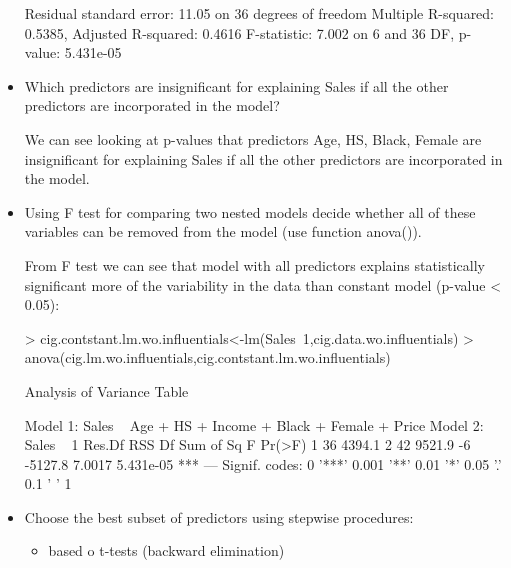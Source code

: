 \documentclass[a4paper]{article}
\begin{document}
\begin{itemize}
\begin{Schunk}
\begin{Soutput}
Residual standard error: 11.05 on 36 degrees of freedom
Multiple R-squared:  0.5385,	Adjusted R-squared:  0.4616 
F-statistic: 7.002 on 6 and 36 DF,  p-value: 5.431e-05
\end{Soutput}
\end{Schunk}
\item Which predictors are insignificant for explaining Sales if all the other
predictors are incorporated in the model?

We can see looking at p-values that predictors Age, HS, Black, Female are insignificant for explaining Sales if all the other
predictors are incorporated in the model.

\item Using F test for comparing two nested models decide whether all of these variables can be removed from the model (use function anova()).

From F test we can see that model with all predictors explains statistically
significant more of the variability in the data than constant model (p-value <
0.05):
\begin{Schunk}
\begin{Sinput}
> cig.contstant.lm.wo.influentials<-lm(Sales~1,cig.data.wo.influentials)
> anova(cig.lm.wo.influentials,cig.contstant.lm.wo.influentials)
\end{Sinput}
\begin{Soutput}
Analysis of Variance Table

Model 1: Sales ~ Age + HS + Income + Black + Female + Price
Model 2: Sales ~ 1
  Res.Df    RSS Df Sum of Sq      F    Pr(>F)    
1     36 4394.1                                  
2     42 9521.9 -6   -5127.8 7.0017 5.431e-05 ***
---
Signif. codes:  0 '***' 0.001 '**' 0.01 '*' 0.05 '.' 0.1 ' ' 1
\end{Soutput}
\end{Schunk}
\item Choose the best subset of predictors using stepwise procedures:
\begin{itemize}
  \item based o t-tests (backward elimination)


\end{itemize}
\end{itemize}
\end{document}
